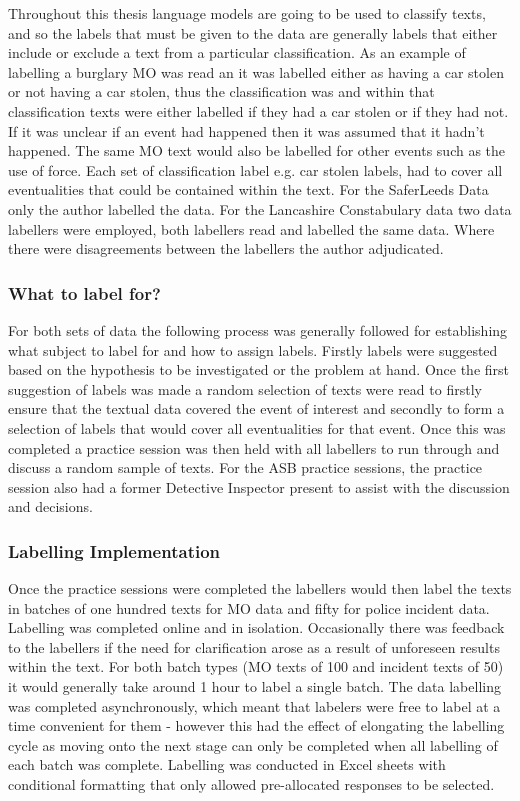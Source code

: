 Throughout this thesis language models are going to be used to classify texts, and so the labels that must be given to the data are generally labels that either include or exclude a text from a particular classification. As an example of labelling a burglary MO was read an it was labelled either as having a car stolen or not having a car stolen, thus the classification was  and within that classification texts were either labelled  if they had a car stolen or  if they had not. If it was unclear if an event had happened then it was assumed that it hadn't happened.  The same MO text would also be labelled for other events such as the use of force. Each set of classification label e.g. car stolen labels, had to cover all eventualities that could be contained within the text. For the SaferLeeds Data only the author labelled the data. For the Lancashire Constabulary data two data labellers were employed, both labellers read and labelled the same data. Where there were disagreements between the labellers the author adjudicated.

\subsubsection{What to label for?}

For both sets of data the following process was generally followed for establishing what subject to label for and how to assign labels. Firstly labels were suggested based on the hypothesis to be investigated or the problem at hand. Once the first suggestion of labels was made a random selection of texts were read to firstly ensure that the textual data covered the event of interest and secondly to form a selection of labels that would cover all eventualities for that event. Once this was completed a practice session was then held with all labellers to run through and discuss a random sample of texts. For the ASB practice sessions, the practice session also had a former Detective Inspector present to assist with the discussion and decisions.

\subsubsection{Labelling Implementation}

Once the practice sessions were completed the labellers would then label the texts in batches of one hundred texts for MO data and fifty for police incident data. Labelling was completed online and in isolation. Occasionally there was feedback to the labellers if the need for clarification arose as a result of unforeseen results within the text. For both batch types (MO texts of 100 and incident texts of 50) it would generally take around 1 hour to label a single batch. The data labelling was completed asynchronously, which meant that labelers were free to label at a time convenient for them - however this had the effect of elongating the labelling cycle as moving onto the next stage can only be completed when all labelling of each batch was complete. Labelling was conducted in Excel sheets with conditional formatting that only allowed pre-allocated responses to be selected.

